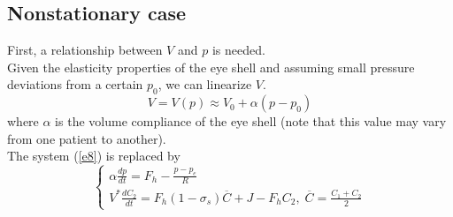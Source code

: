 \documentclass[english,12pt]{article}
\begin{document}
\subsection{Nonstationary case}
First, a relationship between $V$ and $p$ is needed.\\
Given the elasticity properties of the eye shell and assuming small pressure deviations from a certain $p_0$, we can linearize $V$.
\begin{equation}
V = V(p) \approx V_0 + \alpha (p-p_0)
\end{equation}
where $\alpha$ is the volume compliance of the eye shell (note that this value may vary from one patient to another).\\
The system (\ref{e8}) is replaced by
\begin{equation}\label{e11}
\left\{\begin{array}{ll}
 \alpha \displaystyle{\frac{dp}{dt}}=F_{h}-\displaystyle{\frac{p-p_e}{R}}\\
V^{\ast} \displaystyle{\frac{dC_{2}}{dt}}= F_h(1-\sigma_s)\overline{C} + J - F_hC_2,\; \overline{C}= \frac{C_1+C_2}{2}
\end{array}\right.
\end{equation}


\end{document}
